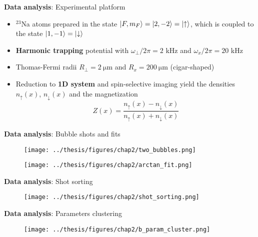 \documentclass[aspectratio=169]{beamer}
\begin{document}
\begin{frame}{\textbf{Data analysis}: Experimental platform}
  \begin{itemize}
    \item $^{23}$Na atoms prepared in the state $\ket{F,m_F} = \ket{2, -2} = \ket{\uparrow}$, which is coupled to the state $\ket{1, -1} = \ket{\downarrow}$
    \item \textbf{Harmonic trapping} potential with $\omega_\perp/2\pi = 2$ \unit{\kilo\hertz} and $\omega_x/2\pi = 20$ \unit{\kilo\hertz}
    \item Thomas-Fermi radii $R_\perp = 2\ \unit{\micro\meter}$ and $R_x = 200\ \unit{\micro\meter}$ (cigar-shaped)
    \item Reduction to \textbf{1D system} and spin-selective imaging yield the densities $n_\uparrow(x)$, $n_\downarrow(x)$ and the magnetization
    \begin{equation*}
      Z(x) = \frac{n_\uparrow(x) - n_\downarrow(x)}{n_\uparrow(x) + n_\downarrow(x)}
    \end{equation*}
  \end{itemize}  
\end{frame}

\begin{frame}{\textbf{Data analysis}: Bubble shots and fits}
  \vspace{-0.1cm}
  \begin{figure}
      \centering
      \texttt{[image: ../thesis/figures/chap2/two\_bubbles.png]}
  \end{figure}
  \vspace{-0.5cm}
  \begin{figure}
      \centering
      \texttt{[image: ../thesis/figures/chap2/arctan\_fit.png]}
  \end{figure}
\end{frame}

\begin{frame}{\textbf{Data analysis}: Shot sorting}
  \begin{figure}
      \centering
      \texttt{[image: ../thesis/figures/chap2/shot\_sorting.png]}
  \end{figure}
\end{frame}

\begin{frame}{\textbf{Data analysis}: Parameters clustering}
  \vspace{-0.1cm}
  \begin{figure}
      \centering
      \texttt{[image: ../thesis/figures/chap2/b\_param\_cluster.png]}
  \end{figure}
\end{frame}
\end{document}
